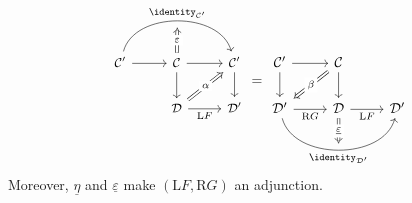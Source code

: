 \begin{theorem}
\begin{equation*}
\begin{gathered}
\begin{tikzcd}[every cell/.append style = {font = \small}]
		\end{tikzcd} \\
		\begin{tikzcd}[every cell/.append style = {font = \small}]
			\mathcal{C}' \arrow[r] \arrow[bend left=75, rr, "{\identity_{\mathcal{C}'}}", ""' {name=I}] & \mathcal{C} \arrow[r] \arrow[d] \arrow[Rightarrow, to=I, "\varepsilon" description] & \mathcal{C}' \arrow[d] \\
			& \mathcal{D} \arrow[r, "{\mathrm{L}F}"'] \arrow[Rightarrow, ru, "\alpha" description] & \mathcal{D}'
		\end{tikzcd} = \begin{tikzcd}
			\mathcal{C}' \arrow[r] \arrow[d] & \mathcal{C} \arrow[d] \arrow[Rightarrow, ld, "\beta" description] & \\
			\mathcal{D}' \arrow[r, "{\mathrm{R}G}"'] \arrow[rr, bend right=75, "{\identity_{\mathcal{D}'}}"', "" {name=I}] & \mathcal{D} \arrow[r, "{\mathrm{L}F}"'] \arrow[Rightarrow, to=I, "\underline{\varepsilon}" description] & \mathcal{D}'
		\end{tikzcd}
	\end{gathered}\end{equation*}
	Moreover, $\underline{\eta}$ and $\underline{\varepsilon}$ make
	$(\mathrm{L}F, \mathrm{R}G)$ an adjunction.
\end{theorem}

